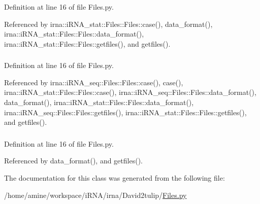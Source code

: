 \-Definition at line 16 of file \-Files.\-py.



\-Referenced by irna\-::i\-R\-N\-A\-\_\-stat\-::\-Files\-::\-Files\-::case(), data\-\_\-format(), irna\-::i\-R\-N\-A\-\_\-stat\-::\-Files\-::\-Files\-::data\-\_\-format(), irna\-::i\-R\-N\-A\-\_\-stat\-::\-Files\-::\-Files\-::getfiles(), and getfiles().

\hypertarget{classirna_1_1David2tulip_1_1Files_1_1Files_a3d3b97a7d6e21920994ce83fb1840022}{
\subsubsection[{results}]{}}
\label{classirna_1_1David2tulip_1_1Files_1_1Files_a3d3b97a7d6e21920994ce83fb1840022}


\-Definition at line 16 of file \-Files.\-py.



\-Referenced by irna\-::i\-R\-N\-A\-\_\-seq\-::\-Files\-::\-Files\-::case(), case(), irna\-::i\-R\-N\-A\-\_\-stat\-::\-Files\-::\-Files\-::case(), irna\-::i\-R\-N\-A\-\_\-seq\-::\-Files\-::\-Files\-::data\-\_\-format(), data\-\_\-format(), irna\-::i\-R\-N\-A\-\_\-stat\-::\-Files\-::\-Files\-::data\-\_\-format(), irna\-::i\-R\-N\-A\-\_\-seq\-::\-Files\-::\-Files\-::getfiles(), irna\-::i\-R\-N\-A\-\_\-stat\-::\-Files\-::\-Files\-::getfiles(), and getfiles().

\hypertarget{classirna_1_1David2tulip_1_1Files_1_1Files_af626bb7a4f93447d7b85220ba5e4c03b}{
\subsubsection[{similarity}]{}}
\label{classirna_1_1David2tulip_1_1Files_1_1Files_af626bb7a4f93447d7b85220ba5e4c03b}


\-Definition at line 16 of file \-Files.\-py.



\-Referenced by data\-\_\-format(), and getfiles().



\-The documentation for this class was generated from the following file\-:\begin{DoxyCompactItemize}
\item 
/home/amine/workspace/i\-R\-N\-A/irna/\-David2tulip/\hyperlink{David2tulip_2Files_8py}{\-Files.\-py}\end{DoxyCompactItemize}
